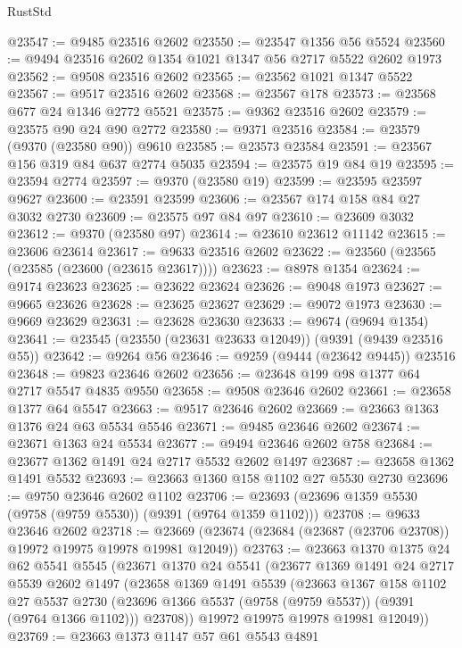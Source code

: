 \begin{lexlean}{RustStd}
\begin{coremodule}
@23547 := @9485 @23516 @2602
@23550 := @23547 @1356 @56 @5524
@23560 := @9494 @23516 @2602 @1354 @1021 @1347 @56 @2717 @5522 @2602 @1973
@23562 := @9508 @23516 @2602
@23565 := @23562 @1021 @1347 @5522
@23567 := @9517 @23516 @2602
@23568 := @23567 @178
@23573 := @23568 @677 @24 @1346 @2772 @5521
@23575 := @9362 @23516 @2602
@23579 := @23575 @90 @24 @90 @2772
@23580 := @9371 @23516
@23584 := @23579 (@9370 (@23580 @90)) @9610
@23585 := @23573 @23584
@23591 := @23567 @156 @319 @84 @637 @2774 @5035
@23594 := @23575 @19 @84 @19
@23595 := @23594 @2774
@23597 := @9370 (@23580 @19)
@23599 := @23595 @23597 @9627
@23600 := @23591 @23599
@23606 := @23567 @174 @158 @84 @27 @3032 @2730
@23609 := @23575 @97 @84 @97
@23610 := @23609 @3032
@23612 := @9370 (@23580 @97)
@23614 := @23610 @23612 @11142
@23615 := @23606 @23614
@23617 := @9633 @23516 @2602
@23622 := @23560 (@23565 (@23585 (@23600 (@23615 @23617))))
@23623 := @8978 @1354
@23624 := @9174 @23623
@23625 := @23622 @23624
@23626 := @9048 @1973
@23627 := @9665 @23626
@23628 := @23625 @23627
@23629 := @9072 @1973
@23630 := @9669 @23629
@23631 := @23628 @23630
@23633 := @9674 (@9694 @1354)
@23641 := @23545 (@23550 (@23631 @23633 @12049)) (@9391 (@9439 @23516 @55))
@23642 := @9264 @56
@23646 := @9259 (@9444 (@23642 @9445)) @23516
@23648 := @9823 @23646 @2602
@23656 := @23648 @199 @98 @1377 @64 @2717 @5547 @4835 @9550
@23658 := @9508 @23646 @2602
@23661 := @23658 @1377 @64 @5547
@23663 := @9517 @23646 @2602
@23669 := @23663 @1363 @1376 @24 @63 @5534 @5546
@23671 := @9485 @23646 @2602
@23674 := @23671 @1363 @24 @5534
@23677 := @9494 @23646 @2602 @758
@23684 := @23677 @1362 @1491 @24 @2717 @5532 @2602 @1497
@23687 := @23658 @1362 @1491 @5532
@23693 := @23663 @1360 @158 @1102 @27 @5530 @2730
@23696 := @9750 @23646 @2602 @1102
@23706 := @23693 (@23696 @1359 @5530 (@9758 (@9759 @5530)) (@9391 (@9764 @1359 @1102)))
@23708 := @9633 @23646 @2602
@23718 := @23669 (@23674 (@23684 (@23687 (@23706 @23708)) @19972 @19975 @19978 @19981 @12049))
@23763 := @23663
    @1370
    @1375
    @24
    @62
    @5541
    @5545
    (@23671
      @1370
      @24
      @5541
      (@23677
        @1369
        @1491
        @24
        @2717
        @5539
        @2602
        @1497
        (@23658
          @1369
          @1491
          @5539
          (@23663
            @1367
            @158
            @1102
            @27
            @5537
            @2730
            (@23696 @1366 @5537 (@9758 (@9759 @5537)) (@9391 (@9764 @1366 @1102)))
            @23708))
        @19972
        @19975
        @19978
        @19981
        @12049))
@23769 := @23663 @1373 @1147 @57 @61 @5543 @4891

\end{coremodule}
\end{lexlean}
